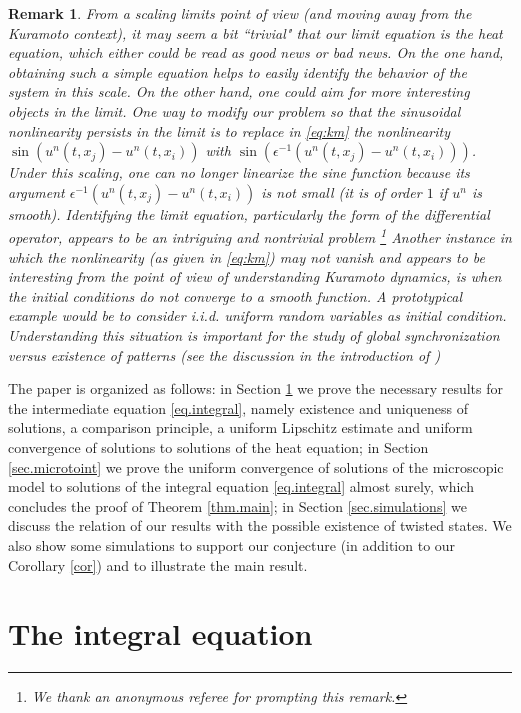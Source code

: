 \documentclass[a4paper,11pt]{amsart}
\newtheorem{remark}[theorem]{Remark}
\newcommand{\red}[1]{{#1}}
\newcommand{\ep}{\epsilon}
\numberwithin{equation}{section}
\numberwithin{theorem}{section}
\theoremstyle{definition}
\begin{document}
\red{
\begin{remark}
    From a scaling limits point of view (and moving away from the Kuramoto context), it may seem a bit ``trivial" that our limit equation is the heat equation, which either could be read as good news or bad news. On the one hand, obtaining such a simple equation helps to easily identify the behavior of the system in this scale. On the other hand, one could aim for more interesting objects in the limit. One way to modify our problem so that the sinusoidal nonlinearity persists in the limit is to replace in \eqref{eq:km} the nonlinearity $\sin \left(u^{n}(t,x_j)-u^{n}(t,x_i)\right)$ with $\sin \left(\ep^{-1}\left(u^{n}(t,x_j)-u^{n}(t,x_i)\right)\right)$. Under this scaling, one can no longer linearize the sine function because its argument $\ep^{-1}\left(u^{n}(t,x_j)-u^{n}(t,x_i)\right)$ is not small (it is of order $1$ if $u^n$ is smooth). Identifying the limit equation, particularly the form of the differential operator, appears to be an intriguing and nontrivial problem \footnote{We thank an anonymous referee for prompting this remark.} Another instance in which the nonlinearity (as given in \eqref{eq:km}) may not vanish and appears to be interesting from the point of view of understanding Kuramoto dynamics, is when the initial conditions do not converge to a smooth function. A prototypical example would be to consider i.i.d. uniform random variables as initial condition. Understanding this situation is important for the study of global synchronization versus existence of patterns (see the discussion in the introduction of \cite{DeVita2025})
\end{remark}}

The paper is organized as follows: in Section \ref{sec.integral} we prove the necessary results for the intermediate equation \eqref{eq.integral}, namely existence and uniqueness of solutions, a comparison principle, a uniform Lipschitz estimate and uniform convergence of solutions to solutions of the heat equation; in Section \ref{sec.microtoint} we prove the uniform convergence of solutions of the microscopic model to solutions of the integral equation \eqref{eq.integral} almost surely, which concludes the proof of Theorem \ref{thm.main}; {in Section \ref{sec.simulations} we discuss the relation of our results with the possible existence of twisted states. We also show some simulations to support our conjecture (in addition to our Corollary \ref{cor}) and to illustrate the main result.}

\section{The integral equation}\label{sec.integral}
\end{document}
